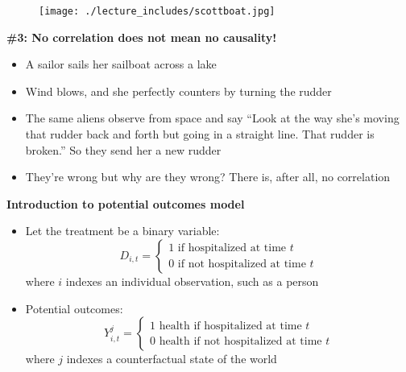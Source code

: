 \documentclass[notes=show]{beamer}
\begin{document}
\begin{frame}[plain]

\begin{figure}
\centering
\texttt{[image: ./lecture\_includes/scottboat.jpg]}
\end{figure}

\end{frame}

\begin{frame}[plain]
\begin{center}
\textbf{\#3: No correlation does not mean no causality!}
\end{center}

\begin{itemize}
	\item A sailor sails her sailboat across a lake
	\item Wind blows, and she perfectly counters by turning the rudder
	\item The same aliens observe from space and say ``Look at the way she's moving that rudder back and forth but going in a straight line.  That rudder is broken.'' So they send her a new rudder
	\item They're wrong but why are they wrong? There is, after all, no correlation
\end{itemize}

\end{frame}



\begin{frame}[plain]
	\begin{center}
	\textbf{Introduction to potential outcomes model}
	\end{center}
	
	\begin{itemize}
	\item Let the treatment be a binary variable: $$D_{i,t} =\begin{cases} 1 \text{ if hospitalized at time $t$} \\ 0 \text{ if not hospitalized at time $t$} \end{cases}$$where $i$ indexes an individual observation, such as a person
	\item Potential outcomes: $$Y_{i,t}^j =\begin{cases} 1 \text{ health if hospitalized at time $t$} \\ 0 \text{ health if not hospitalized at time $t$} \end{cases}$$where $j$ indexes a counterfactual state of the world
	\end{itemize}
\end{frame}
\end{document}
